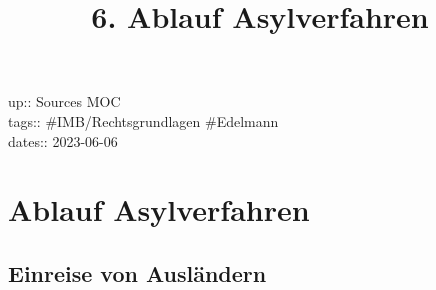 \documentclass[
]{article}
\title{6. Ablauf Asylverfahren}
\author{}
\date{}
\begin{document}
\maketitle

up:: Sources MOC\\
tags:: \#IMB/Rechtsgrundlagen \#Edelmann\\
dates:: 2023-06-06

\hypertarget{ablauf-asylverfahren}{%
\section{Ablauf Asylverfahren}\label{ablauf-asylverfahren}}

\hypertarget{einreise-von-ausluxe4ndern}{%
\subsection{Einreise von Ausländern}\label{einreise-von-ausluxe4ndern}}
\end{document}
